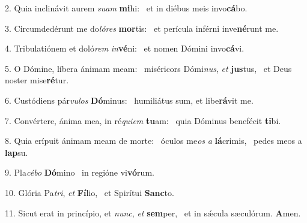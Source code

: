 2. Quia inclinávit aurem \textit{su}\textit{am} \textbf{mi}hi: \ast\  et in diébus meis invo\textbf{cá}bo.\

3. Circumdedérunt me do\textit{ló}\textit{res} \textbf{mor}tis: \ast\  et perícula inférni inve\textbf{né}runt me.\

4. Tribulatiónem et doló\textit{rem} \textit{in}\textbf{vé}ni: \ast\  et nomen Dómini invo\textbf{cá}vi.\

5. O Dómine, líbera ánimam meam: \dag\  miséricors Dómi\textit{nus}, \textit{et} \textbf{jus}tus, \ast\  et Deus noster mise\textbf{ré}tur.\

6. Custódiens pár\textit{vu}\textit{los} \textbf{Dó}minus: \ast\  humiliátus sum, et libe\textbf{rá}vit me.\

7. Convértere, ánima mea, in ré\textit{qui}\textit{em} \textbf{tu}am: \ast\  quia Dóminus benefécit \textbf{ti}bi.\

8. Quia erípuit ánimam meam de morte: \dag\  óculos me\textit{os} \textit{a} \textbf{lá}crimis, \ast\  pedes meos a \textbf{lap}su.\

9. Pla\textit{cé}\textit{bo} \textbf{Dó}mino \ast\  in regióne vi\textbf{vó}rum.\

10. Glória Pa\textit{tri}, \textit{et} \textbf{Fí}lio, \ast\  et Spirítui \textbf{Sanc}to.\

11. Sicut erat in princípio, et \textit{nunc}, \textit{et} \textbf{sem}per, \ast\  et in sǽcula sæculórum. \textbf{A}men.\

